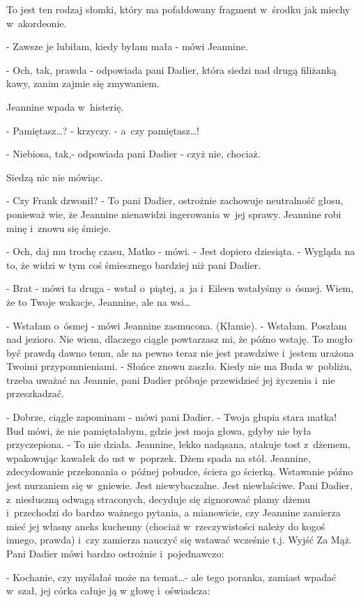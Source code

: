 \documentclass[oneside,polish,12pt,sfheadings]{mwbk}
\begin{document}
To jest ten rodzaj słomki, który ma pofałdowany fragment w~środku
jak miechy w~akordeonie.

- Zawsze je lubiłam, kiedy byłam mała - mówi Jeannine.

- Och, tak, prawda - odpowiada pani Dadier, która siedzi nad drugą
filiżanką kawy, zanim zajmie się zmywaniem.

Jeannine wpada w~histerię.

- Pamiętasz\ldots? - krzyczy. - a~czy pamiętasz\ldots!

- Niebiosa, tak,- odpowiada pani Dadier - czyż nie, chociaż.

Siedzą nic nie mówiąc.

- Czy Frank dzwonił? - To pani Dadier, ostrożnie zachowuje neutralność
głosu, ponieważ wie, że Jeannine nienawidzi ingerowania w~jej sprawy.
Jeannine robi minę i~znowu się śmieje. 

- Och, daj mu trochę czasu, Matko - mówi. - Jest dopiero dziesiąta. - Wygląda na to, że widzi w
tym coś śmiesznego bardziej niż pani Dadier. 

- Brat - mówi ta druga - wstał o~piątej, a~ja i~Eileen wstałyśmy o~ósmej. Wiem, że to Twoje wakacje, Jeannine, ale na wsi\ldots

- Wstałam o~ósmej - mówi Jeannine zasmucona. (Kłamie). - Wstałam.
Poszłam nad jezioro. Nie wiem, dlaczego ciągle powtarzasz mi, że późno
wstaję. To mogło być prawdą dawno temu, ale na pewno teraz nie jest
prawdziwe i~jestem urażona Twoimi przypomnieniami. - Słońce znowu
zaszło. Kiedy nie ma Buda w~pobliżu, trzeba uważać na Jeannie, pani
Dadier próbuje przewidzieć jej życzenia i~nie przeszkadzać.

- Dobrze, ciągle zapominam - mówi pani Dadier. - Twoja głupia stara
matka! Bud mówi, że nie pamiętałabym, gdzie jest moja głowa, gdyby
nie była przyczepiona. - To nie działa. Jeannine, lekko nadąsana,
atakuje tost z~dżemem, wpakowując kawałek do ust w~poprzek. Dżem spada
na stół. Jeannine, zdecydowanie przekonania o~późnej pobudce, ściera
go ścierką. Wstawanie późno jest nurzaniem się w~gniewie. Jest niewybaczalne.
Jest niewłaściwe. Pani Dadier, z~niesłuszną odwagą straconych, decyduje
się zignorować plamy dżemu i~przechodzi do bardzo ważnego pytania,
a mianowicie, czy Jeannine zamierza mieć jej własny aneks kuchenny
(chociaż w~rzeczywistości należy do kogoś innego, prawda) i~czy zamierza
nauczyć się wstawać wcześnie t.j. Wyjść Za Mąż. Pani Dadier mówi
bardzo ostrożnie i~pojednawczo: 

- Kochanie, czy myślałaś może na temat\ldots - ale tego poranka, zamiast wpadać w~szał, jej córka całuje ją w głowę i~oświadcza: 
\end{document}
